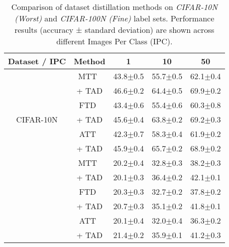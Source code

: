 \begin{table}[ht]
    \centering
    \renewcommand{\arraystretch}{1.05}
    \setlength{\tabcolsep}{5pt}
    \caption{
    Comparison of dataset distillation methods on \textit{CIFAR-10N (Worst)} and \textit{CIFAR-100N (Fine)} label sets. 
    Performance results (accuracy ± standard deviation) are shown across different Images Per Class (IPC).
    }
    \tiny
\begin{tabular}{c|c|c|c|c}
\toprule	
Dataset / IPC & Method & 1 & 10 & 50 \\ \midrule[.8pt] \midrule[.8pt]
\multirow{7}{*}{CIFAR-10N} & MTT~\cite{cazenavette2022distillation}  &   43.8$\pm$0.5 & 55.7$\pm$0.5 & 62.1$\pm$0.4 \\ 
& \cellcolor[HTML]{EFEFEF}+ TAD & \cellcolor[HTML]{EFEFEF}46.6$\pm$0.2  &\cellcolor[HTML]{EFEFEF}64.4$\pm$0.5  & \cellcolor[HTML]{EFEFEF}69.9$\pm$0.2 \\  
\cmidrule{2-5}
&FTD~\cite{du2023minimizing}               &   43.4$\pm$0.6 & 55.4$\pm$0.6 & 60.3$\pm$0.8 \\ 
& \cellcolor[HTML]{EFEFEF}+ TAD   &   \cellcolor[HTML]{EFEFEF}45.6$\pm$0.4 & \cellcolor[HTML]{EFEFEF}63.8$\pm$0.2 & \cellcolor[HTML]{EFEFEF}69.2$\pm$0.3  \\ \cmidrule{2-5}
&ATT~\cite{liu2024dataset}                 &   42.3$\pm$0.7 & 58.3$\pm$0.4 & 61.9$\pm$0.2 \\ 
&  \cellcolor[HTML]{EFEFEF}+ TAD                                    & \cellcolor[HTML]{EFEFEF}45.9$\pm$0.4   & \cellcolor[HTML]{EFEFEF}65.7$\pm$0.2 & \cellcolor[HTML]{EFEFEF}68.9$\pm$0.2 \\ \midrule[.8pt] \midrule[.8pt]
\multirow{7}{*}{CIFAR-100N}& MTT~\cite{cazenavette2022distillation}  &   20.2$\pm$0.4 & 32.8$\pm$0.3 & 38.2$\pm$0.3 \\ 
&   \cellcolor[HTML]{EFEFEF}+ TAD                                 &   \cellcolor[HTML]{EFEFEF}20.1$\pm$0.3 & \cellcolor[HTML]{EFEFEF}36.4$\pm$0.2 & \cellcolor[HTML]{EFEFEF} 42.1$\pm$0.1 \\ \cmidrule{2-5}
& FTD~\cite{du2023minimizing}            &     20.3$\pm$0.3 & 32.7$\pm$0.2 & 37.8$\pm$0.2 \\ 
& \cellcolor[HTML]{EFEFEF}+ TAD                                 &   \cellcolor[HTML]{EFEFEF}20.7$\pm$0.3 & \cellcolor[HTML]{EFEFEF}35.1$\pm$0.2 & \cellcolor[HTML]{EFEFEF}41.8$\pm$0.1\\ \cmidrule{2-5}
& ATT~\cite{liu2024dataset}              &    20.1$\pm$0.4 & 32.0$\pm$0.4 & 36.3$\pm$0.2\\ 
& \cellcolor[HTML]{EFEFEF}+ TAD                                 &  \cellcolor[HTML]{EFEFEF}21.4$\pm$0.2    &\cellcolor[HTML]{EFEFEF}35.9$\pm$0.1  & \cellcolor[HTML]{EFEFEF}41.2$\pm$0.3 \\ 
\bottomrule
\end{tabular}
\label{tab2}
\end{table}
